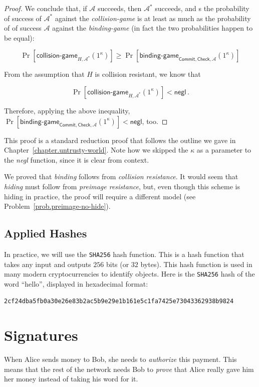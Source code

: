 \begin{proof}
  We conclude that, if $\mathcal{A}$ succeeds, then $\mathcal{A}^*$ succeeds, and s
  the probability of success of $\mathcal{A}^*$ against the \emph{collision-game}
  is at least as much as the probability of of success $\mathcal{A}$ against the \emph{binding-game}
  (in fact the two probabilities happen to be equal):

  \[
    \Pr[\textsf{collision-game}_{H,\mathcal{A}^*}(1^\kappa)] \geq
    \Pr[\textsf{binding-game}_{\textsf{Commit},\textsf{Check},\mathcal{A}}(1^\kappa)]
  \]

  From the assumption that $H$ is collision resistant, we know that

  \[
    \Pr[\textsf{collision-game}_{H,\mathcal{A}^*}(1^\kappa)] < \textsf{negl}\,.
  \]

  Therefore, applying the above inequality,
  $\Pr[\textsf{binding-game}_{\textsf{Commit},\textsf{Check},\mathcal{A}}(1^\kappa)] < \textsf{negl}$,
  too.
\end{proof}

This proof is a standard reduction proof that follows the outline we gave in Chapter~\ref{chapter.untrusty-world}.
Note how we skipped the $\kappa$ as a parameter to the \emph{negl} function, since it is clear
from context.

We proved that \emph{binding} follows from \emph{collision resistance}. It would seem that
\emph{hiding} must follow from \emph{preimage resistance}, but, even though this scheme is
hiding in practice, the proof will require a different model (see Problem~\ref{prob.preimage-no-hide}).

\subsection*{Applied Hashes}

In practice, we will use the \texttt{SHA256} hash function. This is a hash function that takes
any input and outputs $256$ bits (or $32$ bytes). This hash function is used in many modern
cryptocurrencies to identify objects. Here is the \texttt{SHA256} hash of the word ``hello'',
displayed in hexadecimal format:

\texttt{2cf24dba5fb0a30e26e83b2ac5b9e29e1b161e5c1fa7425e73043362938b9824}

\section{Signatures}

When Alice sends money to Bob, she needs to \emph{authorize} this payment. This means
that the rest of the network needs Bob to \emph{prove} that Alice really gave him
her money instead of taking his word for it.

